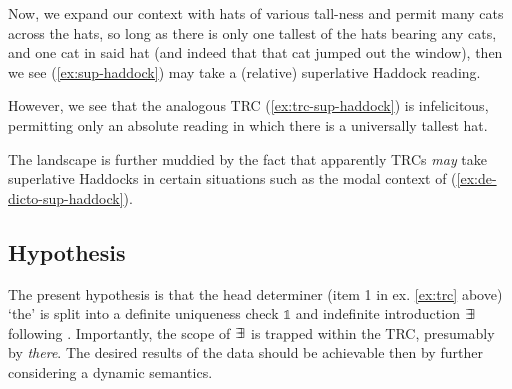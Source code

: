 \documentclass[11pt]{article}
\DeclareMathOperator{\bbexists}{\exists\mskip-7mu\exists}
\begin{document}
\begin{exe}
	\label{ex:haddock}
\end{exe}

Now, we expand our context with hats of various tall-ness and permit many cats across the hats, so long as there is only one tallest of the hats bearing any cats, and one cat in said hat (and indeed that that cat jumped out the window), then we see (\ref{ex:sup-haddock}) may take a (relative) superlative Haddock reading.

\begin{exe}
	\label{ex:sup-haddock}
\end{exe}

However, we see that the analogous TRC (\ref{ex:trc-sup-haddock}) is infelicitous, permitting only an absolute reading in which there is a universally tallest hat.

\begin{exe}
	\label{ex:trc-sup-haddock}
\end{exe}

The landscape is further muddied by the fact that apparently TRCs \textit{may} take superlative Haddocks in certain situations such as the modal context of (\ref{ex:de-dicto-sup-haddock}).

\begin{exe}
	\label{ex:de-dicto-sup-haddock}
\end{exe}

\subsection{Hypothesis}

The present hypothesis is that the head determiner (item 1 in ex. \ref{ex:trc} above) `the' is split into a definite uniqueness check \(\mathbb{1}\) and indefinite introduction \(\bbexists\) following \citet{bumfordSplitscopeEffectsDefinite2017}. Importantly, the scope of \(\bbexists\) is trapped within the TRC, presumably by \textit{there}. The desired results of the data should be achievable then by further considering a dynamic semantics.
\end{document}
